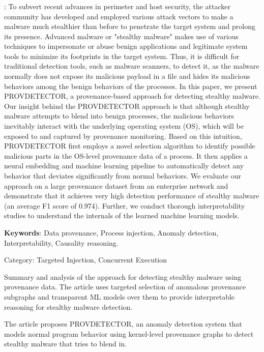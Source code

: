 \documentclass{article}
\begin{document}
\subsubsection{\textcite{Wang:2020}}
\textbf{}:  To subvert recent advances in perimeter and host security, the attacker community has developed and employed various attack vectors to make a malware much stealthier than before to penetrate the target system and prolong its presence. Advanced malware or "stealthy malware" makes use of various techniques to impersonate or abuse benign applications and legitimate system tools to minimize its footprints in the target system. Thus, it is difficult for traditional detection tools, such as malware scanners, to detect it, as the malware normally does not expose its malicious payload in a file and hides its malicious behaviors among the benign behaviors of the processes. In this paper, we present PROVDETECTOR, a provenance-based approach for detecting stealthy malware. Our insight behind the PROVDETECTOR approach is that although stealthy malware attempts to blend into benign processes, the malicious behaviors inevitably interact with the underlying operating system (OS), which will be exposed to and captured by provenance monitoring. Based on this intuition, PROVDETECTOR first employs a novel selection algorithm to identify possible malicious parts in the OS-level provenance data of a process. It then applies a neural embedding and machine learning pipeline to automatically detect any behavior that deviates significantly from normal behaviors. We evaluate our approach on a large provenance dataset from an enterprise network and demonstrate that it achieves very high detection performance of stealthy malware (an average F1 score of 0.974). Further, we conduct thorough interpretability studies to understand the internals of the learned machine learning models.

\textbf{Keywords}: Data provenance, Process injection, Anomaly detection, Interpretability, Causality reasoning.

Category: Targeted Injection, Concurrent Execution

Summary and analysis of the approach for detecting stealthy malware using provenance data.  The article uses targeted selection of anomalous provenance subgraphs and transparent ML models over them to provide interpretable reasoning for stealthy malware detection.

The article proposes PROVDETECTOR, an anomaly detection system that models normal program behavior using kernel-level provenance graphs to detect stealthy malware that tries to blend in.
\end{document}
